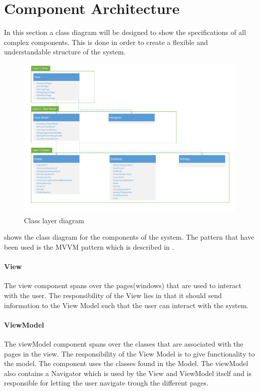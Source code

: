 \section{Component Architecture}
In this section a class diagram will be designed to show the specifications of all complex
components. This is done in order to create a flexible and understandable structure of the system.

\begin{figure}[H]
\includegraphics[width=\linewidth]{Grafik/FoodPlanner/ComponentDiagram}
\centering
\caption{Class layer diagram}
\label{LayerDiagram}
\end{figure}

 shows the class diagram for the components of the system. The pattern that have been
used is the MVVM pattern which is described in .

\paragraph{View}
The view component spans over the pages(windows) that are used to interact with the user. The responsibility of the View lies in that it should send information to the View Model such that the user can interact with the system.

\paragraph{ViewModel}
The viewModel component spans over the classes that are associated with the pages in the view. The responsibility of the View Model is to give functionality to the model. The component uses the classes found in the Model. The viewModel also contains a Navigator which is used by the View and ViewModel itself and is responsible for letting the user navigate trough the different pages.

